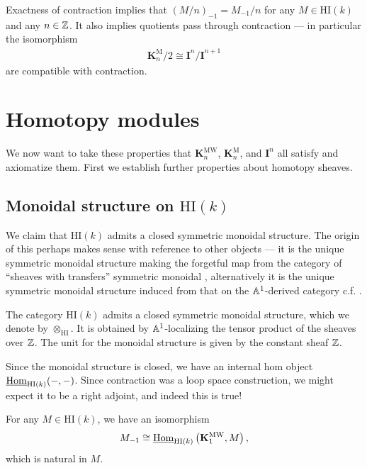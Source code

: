 \documentclass[11pt,openany]{book}
\providecommand{\HI}{\mathrm{HI}}
\providecommand{\KM}{\mathbf{K}^\mathrm{M}}
\providecommand{\KMW}{\mathbf{K}^\mathrm{MW}}
\begin{document}
\begin{corollary} Exactness of contraction implies that $(M/n)_{-1} = M_{-1}/n$ for any $M \in \HI(k)$ and any $n \in \mathbb{Z}$. It also implies quotients pass through contraction --- in particular the isomorphism
\begin{align*}
    \KM_n/2 \cong \mathbf{I}^n/\mathbf{I}^{n+1}
\end{align*}
are compatible with contraction.
\end{corollary}


\section{Homotopy modules}

We now want to take these properties that $\KMW_n$, $\KM_n$, and $\mathbf{I}^n$ all satisfy and axiomatize them. First we establish further properties about homotopy sheaves.

\subsection{Monoidal structure on $\HI(k)$}

We claim that $\HI(k)$ admits a closed symmetric monoidal structure. The origin of this perhaps makes sense with reference to other objects --- it is the unique symmetric monoidal structure making the forgetful map from the category of ``sheaves with transfers'' symmetric monoidal \cite[Lemme~1.8]{Deglise-MH}, alternatively it is the unique symmetric monoidal structure induced from that on the $\mathbb{A}^1$-derived category c.f. \cite[1.5.1.20]{Feld-thesis}. 

\begin{theorem} The category $\HI(k)$ admits a closed symmetric monoidal structure, which we denote by $\otimes_\HI$. It is obtained by $\mathbb{A}^1$-localizing the tensor product of the sheaves over $\mathbb{Z}$. The unit for the monoidal structure is given by the constant sheaf $\mathbb{Z}$. 
\end{theorem}

Since the monoidal structure is closed, we have an internal hom object $\underline{\Hom}_{\HI(k)}(-,-)$. Since contraction was a loop space construction, we might expect it to be a right adjoint, and indeed this is true!

\begin{proposition} For any $M \in \HI(k)$, we have an isomorphism
\begin{align*}
    M_{-1} \cong \underline{\Hom}_{\HI(k)} \left( \KMW_1, M \right),
\end{align*}
which is natural in $M$.
\end{proposition}
\end{document}
